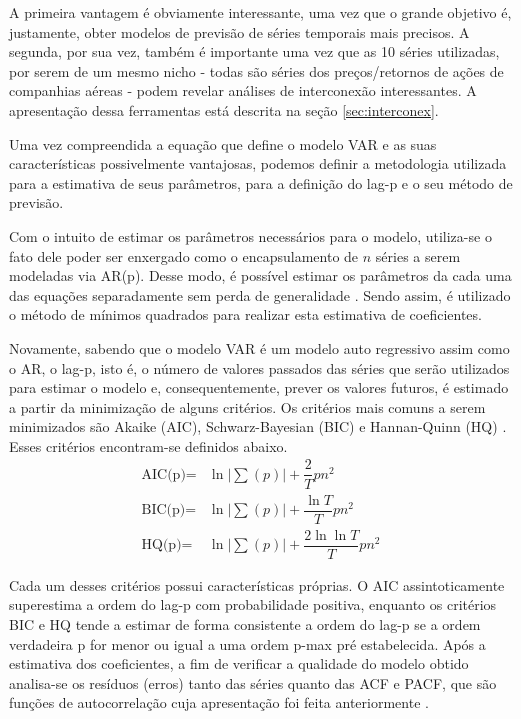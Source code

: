 \documentclass[12pt]{article}
\begin{document}
	A primeira vantagem é obviamente interessante, uma vez que o grande objetivo é, justamente, obter modelos de previsão de séries temporais mais precisos. A segunda, por sua vez, também é importante uma vez que as 10 séries utilizadas, por serem de um mesmo nicho - todas são séries dos preços/retornos de ações de companhias aéreas - podem revelar análises de interconexão interessantes. A apresentação dessa ferramentas está descrita na seção \ref{sec:interconex}.
	
	Uma vez compreendida a equação que define o modelo VAR e as suas características possivelmente vantajosas, podemos definir a metodologia utilizada para a estimativa de seus parâmetros, para a definição do \textrm{lag-p} e o seu método de previsão.
	
	Com o intuito de estimar os parâmetros necessários para o modelo, utiliza-se o fato dele poder ser enxergado como o encapsulamento de $n$ séries a serem modeladas via AR(p). Desse modo, é possível estimar os parâmetros da cada uma das equações separadamente sem perda de generalidade \cite{VAR}. Sendo assim, é utilizado o método de mínimos quadrados para realizar esta estimativa de coeficientes.
	
	Novamente, sabendo que o modelo VAR é um modelo auto regressivo assim como o AR, o \textrm{lag-p}, isto é, o número de valores passados das séries que serão utilizados para estimar o modelo e, consequentemente, prever os valores futuros, é estimado a partir da minimização de alguns critérios. Os critérios mais comuns a serem minimizados são \textrm{Akaike} (AIC), \textrm{Schwarz-Bayesian} (BIC) e \textrm{Hannan-Quinn} (HQ) \cite{VAR}. Esses critérios encontram-se definidos abaixo.
	\begin{align*}
		\textrm{AIC(p)}=&\ln\left|\sum(p)\right|+\dfrac{2}{T}pn^2\\
		\textrm{BIC(p)}=&\ln\left|\sum(p)\right|+\dfrac{\ln T}{T}pn^2\\
		\textrm{HQ(p)}=&\ln\left|\sum(p)\right|+\dfrac{2\ln \ln T}{T}pn^2
	\end{align*}

	Cada um desses critérios possui características próprias. O AIC assintoticamente superestima a ordem do \textrm{lag-p} com probabilidade positiva, enquanto os critérios BIC e HQ tende a estimar de forma consistente a ordem do \textrm{lag-p} se a ordem verdadeira \textrm{p} for menor ou igual a uma ordem \textrm{p-max} pré estabelecida. Após a estimativa dos coeficientes, a fim de verificar a qualidade do modelo obtido analisa-se os resíduos (erros) tanto das séries quanto das ACF e PACF, que são funções de autocorrelação cuja apresentação foi feita anteriormente \cite{Tsay-Tiao1984}.
	
\end{document}
